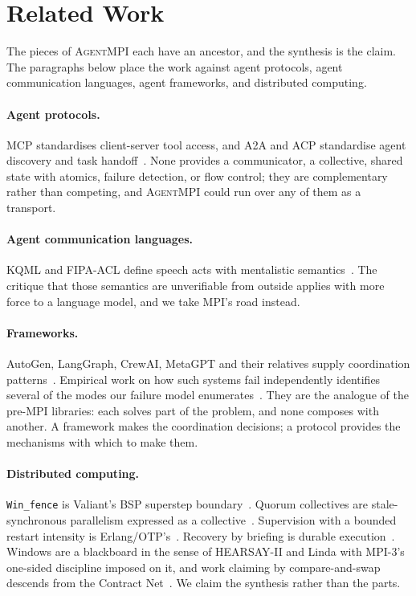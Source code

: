 \documentclass[sigconf,nonacm]{acmart}
\newcommand{\ampi}{\textsc{AgentMPI}\xspace}
\newcommand{\code}[1]{\texttt{\small #1}}
\begin{document}
\section{Related Work}
\label{sec:related}

The pieces of \ampi each have an ancestor, and the synthesis is the claim. The
paragraphs below place the work against agent protocols, agent communication
languages, agent frameworks, and distributed computing.

\paragraph{Agent protocols.} MCP standardises client-server tool access, and A2A
and ACP standardise agent discovery and task
handoff~\cite{mcp2026spec,a2a2026spec}. None provides a communicator, a
collective, shared state with atomics, failure detection, or flow control; they
are complementary rather than competing, and \ampi could run over any of them as
a transport.

\paragraph{Agent communication languages.} KQML and FIPA-ACL define speech acts
with mentalistic semantics~\cite{finin1994kqml,fipa2002acl,labrou1994kqml}. The
critique that those semantics are unverifiable from outside applies with more
force to a language model, and we take MPI's road instead.

\paragraph{Frameworks.} AutoGen, LangGraph, CrewAI, MetaGPT and their relatives
supply coordination patterns~\cite{wu2023autogen}. Empirical work on how such
systems fail independently identifies several of the modes our failure model
enumerates~\cite{cemri2025mast}. They are the analogue of the pre-MPI libraries:
each solves part of the problem, and none composes with another. A framework
makes the coordination decisions; a protocol provides the mechanisms with which
to make them.

\paragraph{Distributed computing.} \code{Win\_fence} is Valiant's BSP superstep
boundary~\cite{valiant1990bsp}. Quorum collectives are stale-synchronous
parallelism expressed as a collective~\cite{ho2013ssp}. Supervision with a
bounded restart intensity is Erlang/OTP's~\cite{armstrong2003erlang,otpsupervisor}.
Recovery by briefing is durable execution~\cite{azuredurable}. Windows are a
blackboard in the sense of HEARSAY-II and Linda with MPI-3's one-sided discipline
imposed on it, and work claiming by compare-and-swap descends from the Contract
Net~\cite{hayesroth1985blackboard,gelernter1985linda,smith1980contractnet}. We
claim the synthesis rather than the parts.
\end{document}
